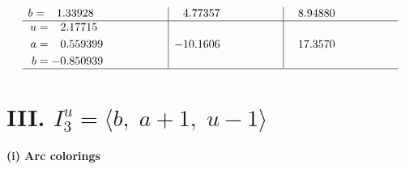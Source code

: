 \documentclass[1p]{elsarticle_modified}
\theoremstyle{definition}
\begin{document}
$$\begin{array}{c|c|c}
\begin{aligned}
b &= \phantom{-}1.33928\phantom{ +0.000000I}\end{aligned}
 & \phantom{-}4.77357\phantom{ +0.000000I} & \phantom{-}8.94880\phantom{ +0.000000I} \\ \hline\begin{aligned}
u &= \phantom{-}2.17715\phantom{ +0.000000I} \\
a &= \phantom{-}0.559399\phantom{ +0.000000I} \\
b &= -0.850939\phantom{ +0.000000I}\end{aligned}
 & -10.1606\phantom{ +0.000000I} & \phantom{-}17.3570\phantom{ +0.000000I}\\
 \hline 
 \end{array}$$\newpage\newpage\renewcommand{\arraystretch}{1}
\centering \section*{III. $I^u_{3}= \langle b,\;a+1,\;u-1 \rangle$}
\flushleft \textbf{(i) Arc colorings}\\
\end{document}
